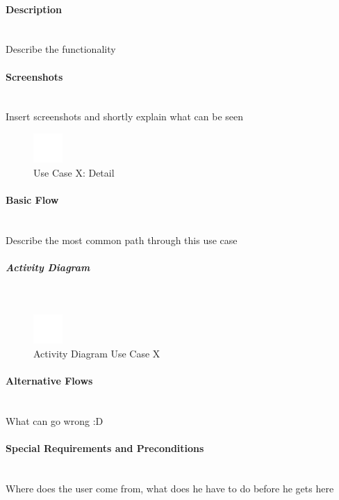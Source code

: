 \paragraph*{Description}\mbox{}\\
Describe the functionality

\paragraph*{Screenshots}\mbox{}\\
Insert screenshots and shortly explain what can be seen
\begin{figure}[h] 
	\centering
	\includegraphics[width=0.1\textwidth]{Content/Domain/placeholder.png}
	\caption{Use Case X: Detail}
	\label{fig:label7}
\end{figure}

\paragraph*{Basic Flow} \mbox{}\\

Describe the most common path through this use case

\subparagraph{Activity Diagram}\mbox{}\\
\begin{figure}[h]
	\centering
	\includegraphics[width=0.1\textwidth]{Content/Domain/placeholder.png}
	\caption{Activity Diagram Use Case X}
	\label{fig:label77}
\end{figure}

\paragraph*{Alternative Flows}\mbox{}\\
What can go wrong :D

\paragraph*{Special Requirements and Preconditions}\mbox{}\\
Where does the user come from, what does he have to do before he gets here

